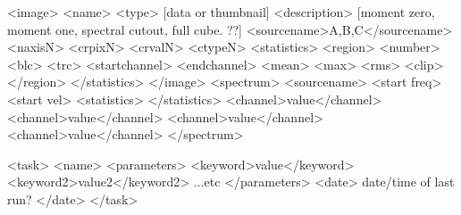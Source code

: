 \documentclass{report}
\begin{document}
<image>
   <name>
   <type> [data or thumbnail]
   <description> [moment zero, moment one, spectral cutout, full cube. ??] 
   <sourcename>A,B,C</sourcename> %
   <naxisN>
   <crpixN>
   <crvalN>
   <ctypeN>
   <statistics>
        <region>
            <number>
            <blc>
            <trc>
            <startchannel>
            <endchannel>
            <mean>
            <max>
            <rms>
            <clip>
        </region>
   </statistics>
</image>
<spectrum>
   <sourcename>
   <start freq>
   <start vel>
   <statistics> </statistics> %
   <channel>value</channel>
   <channel>value</channel>
   <channel>value</channel>
   <channel>value</channel> 
</spectrum>

<task>
  <name>
  <parameters>
    <keyword>value</keyword>
    <keyword2>value2</keyword2>
    ...etc
  </parameters>
  <date> date/time of last run? </date>
</task>
\end{document}
